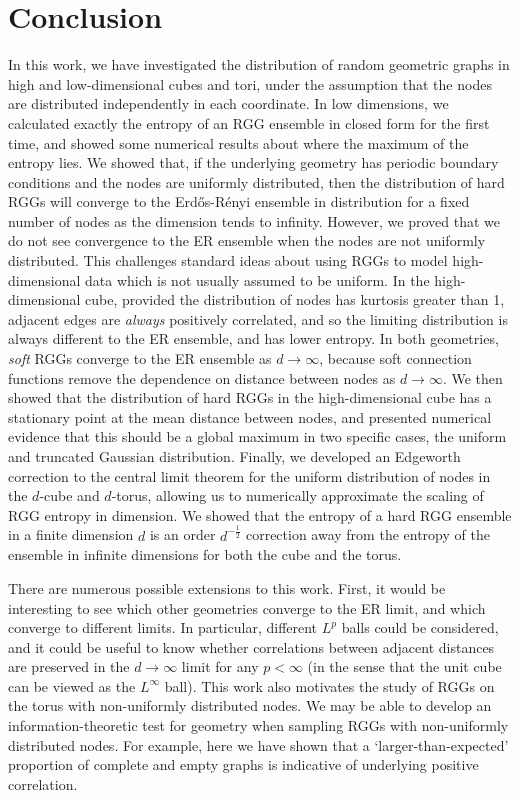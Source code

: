 \documentclass{article}
\newcommand{\tti}{\rightarrow\infty}
\begin{document}
\section{Conclusion}
In this work, we have investigated the distribution of random geometric graphs in high and low-dimensional cubes and tori, under the assumption that the nodes are distributed independently in each coordinate. In low dimensions, we calculated exactly the entropy of an RGG ensemble in closed form for the first time, and showed some numerical results about where the maximum of the entropy lies. We showed that, if the underlying geometry has periodic boundary conditions and the nodes are uniformly distributed, then the distribution of hard RGGs will converge to the Erd\H os-R\'enyi ensemble in distribution for a fixed number of nodes as the dimension tends to infinity. However, we proved that we do not see convergence to the ER ensemble when the nodes are not uniformly distributed. This challenges standard ideas about using RGGs to model high-dimensional data which is not usually assumed to be uniform. In the high-dimensional cube, provided the distribution of nodes has kurtosis greater than 1, adjacent edges are \textit{always} positively correlated, and so the limiting distribution is always different to the ER ensemble, and has lower entropy. In both geometries, \textit{soft} RGGs converge to the ER ensemble as $d\tti$, because soft connection functions remove the dependence on distance between nodes as $d\tti$. We then showed that the distribution of hard RGGs in the high-dimensional cube has a stationary point at the mean distance between nodes, and presented numerical evidence that this should be a global maximum in two specific cases, the uniform and truncated Gaussian distribution. Finally, we developed an Edgeworth correction to the central limit theorem for the uniform distribution of nodes in the $d$-cube and $d$-torus, allowing us to numerically approximate the scaling of RGG entropy in dimension. We showed that the entropy of a hard RGG ensemble in a finite dimension $d$ is an order $d^{-\frac{1}{2}}$ correction away from the entropy of the ensemble in infinite dimensions for both the cube and the torus. \newline

There are numerous possible extensions to this work. First, it would be interesting to see which other geometries converge to the ER limit, and which converge to different limits. In particular, different $L^p$ balls could be considered, and it could be useful to know whether correlations between adjacent distances are preserved in the $d\tti$ limit for any $p < \infty$ (in the sense that the unit cube can be viewed as the $L^{\infty}$ ball). This work also motivates the study of RGGs on the torus with non-uniformly distributed nodes. We may be able to develop an information-theoretic test for geometry when sampling RGGs with non-uniformly distributed nodes. For example, here we have shown that a `larger-than-expected' proportion of complete and empty graphs is indicative of underlying positive correlation.
\end{document}

